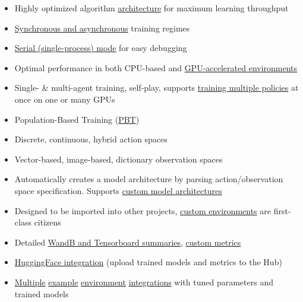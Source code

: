 \documentclass[11pt,a4paper]{article}
\begin{document}
\begin{itemize}
\tightlist
\item
  Highly optimized algorithm \href{https://www.samplefactory.dev/06-architecture/overview/}{architecture} for maximum learning throughput
\item
  \href{https://www.samplefactory.dev/07-advanced-topics/sync-async/}{Synchronous and asynchronous} training regimes
\item
  \href{https://www.samplefactory.dev/07-advanced-topics/serial-mode/}{Serial (single-process) mode} for easy debugging
\item
  Optimal performance in both CPU-based and \href{https://www.samplefactory.dev/09-environment-integrations/isaacgym/}{GPU-accelerated environments}
\item
  Single- \& multi-agent training, self-play, supports \href{https://www.samplefactory.dev/07-advanced-topics/multi-policy-training/}{training multiple policies} at once on one or many GPUs
\item
  Population-Based Training (\href{https://www.samplefactory.dev/07-advanced-topics/pbt/}{PBT})
\item
  Discrete, continuous, hybrid action spaces
\item
  Vector-based, image-based, dictionary observation spaces
\item
  Automatically creates a model architecture by parsing action/observation space specification. Supports \href{https://www.samplefactory.dev/03-customization/custom-models/}{custom model architectures}
\item
  Designed to be imported into other projects, \href{https://www.samplefactory.dev/03-customization/custom-environments/}{custom environments} are first-class citizens
\item
  Detailed \href{https://www.samplefactory.dev/05-monitoring/metrics-reference/}{WandB and Tensorboard summaries}, \href{https://www.samplefactory.dev/05-monitoring/custom-metrics/}{custom metrics}
\item
  \href{https://www.samplefactory.dev/10-huggingface/huggingface/}{HuggingFace integration} (upload trained models and metrics to the Hub)
\item
  \href{https://www.samplefactory.dev/09-environment-integrations/mujoco/}{Multiple} \href{https://www.samplefactory.dev/09-environment-integrations/atari/}{example} \href{https://www.samplefactory.dev/09-environment-integrations/vizdoom/}{environment} \href{https://www.samplefactory.dev/09-environment-integrations/dmlab/}{integrations} with tuned parameters and trained models
\end{itemize}
\end{document}

